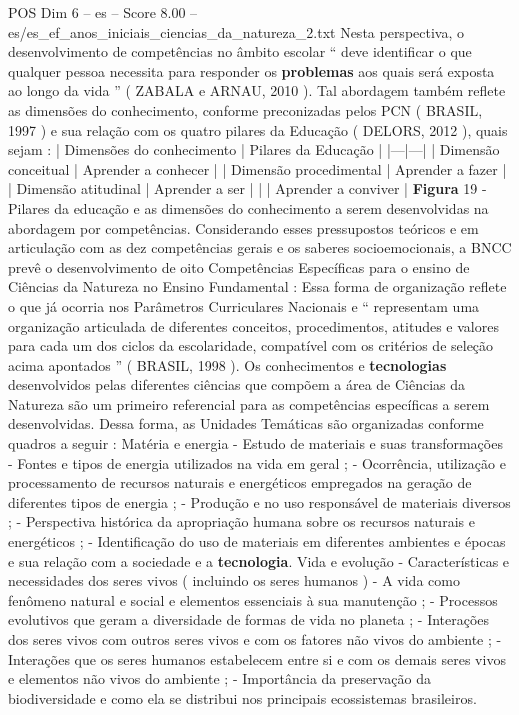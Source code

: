 \begin{textsample}{POS Dim 6 – es – Score 8.00 – es/es\_ef\_anos\_iniciais\_ciencias\_da\_natureza\_2.txt}
Nesta perspectiva, o desenvolvimento de competências no âmbito escolar “ deve identificar o que qualquer pessoa necessita para responder os \textbf{problemas} aos quais será exposta ao longo da vida ” ( ZABALA e ARNAU, 2010 ).
Tal abordagem também reflete as dimensões do conhecimento, conforme preconizadas pelos PCN ( BRASIL, 1997 ) e sua relação com os quatro pilares da Educação ( DELORS, 2012 ), quais sejam : | Dimensões do conhecimento | Pilares da Educação | |---|---| | Dimensão conceitual | Aprender a conhecer | | Dimensão procedimental | Aprender a fazer | | Dimensão atitudinal | Aprender a ser | | | Aprender a conviver | \textbf{Figura} 19 - Pilares da educação e as dimensões do conhecimento a serem desenvolvidas na abordagem por competências.
Considerando esses pressupostos teóricos e em articulação com as dez competências gerais e os saberes socioemocionais, a BNCC prevê o desenvolvimento de oito Competências Específicas para o ensino de Ciências da Natureza no Ensino Fundamental : Essa forma de organização reflete o que já ocorria nos Parâmetros Curriculares Nacionais e “ representam uma organização articulada de diferentes conceitos, procedimentos, atitudes e valores para cada um dos ciclos da escolaridade, compatível com os critérios de seleção acima apontados ” ( BRASIL, 1998 ).
Os conhecimentos e \textbf{tecnologias} desenvolvidos pelas diferentes ciências que compõem a área de Ciências da Natureza são um primeiro referencial para as competências específicas a serem desenvolvidas.
Dessa forma, as Unidades Temáticas são organizadas conforme quadros a seguir : Matéria e energia - Estudo de materiais e suas transformações - Fontes e tipos de energia utilizados na vida em geral ; - Ocorrência, utilização e processamento de recursos naturais e energéticos empregados na geração de diferentes tipos de energia ; - Produção e no uso responsável de materiais diversos ; - Perspectiva histórica da apropriação humana sobre os recursos naturais e energéticos ; - Identificação do uso de materiais em diferentes ambientes e épocas e sua relação com a sociedade e a \textbf{tecnologia}.
Vida e evolução - Características e necessidades dos seres vivos ( incluindo os seres humanos ) - A vida como fenômeno natural e social e elementos essenciais à sua manutenção ; - Processos evolutivos que geram a diversidade de formas de vida no planeta ; - Interações dos seres vivos com outros seres vivos e com os fatores não vivos do ambiente ; - Interações que os seres humanos estabelecem entre si e com os demais seres vivos e elementos não vivos do ambiente ; - Importância da preservação da biodiversidade e como ela se distribui nos principais ecossistemas brasileiros.

\end{textsample}
